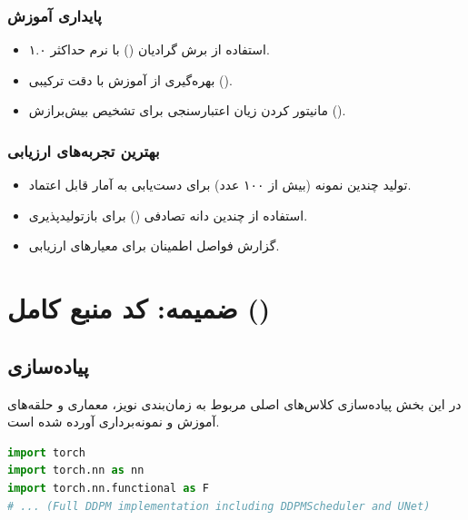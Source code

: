 \begin{latin}
\subsubsection{پایداری آموزش}
\begin{itemize}
    \item استفاده از برش گرادیان () با نرم حداکثر ۱.۰.
    \item بهره‌گیری از آموزش با دقت ترکیبی ().
    \item مانیتور کردن زیان اعتبارسنجی برای تشخیص بیش‌برازش ().
\end{itemize}



\subsubsection{بهترین تجربه‌های ارزیابی}
\begin{itemize}
    \item تولید چندین نمونه (بیش از ۱۰۰ عدد) برای دست‌یابی به آمار قابل اعتماد.
    \item استفاده از چندین دانه تصادفی () برای بازتولیدپذیری.
    \item گزارش فواصل اطمینان برای معیارهای ارزیابی.
\end{itemize}

\clearpage

\section{ضمیمه: کد منبع کامل ()}

\subsection{پیاده‌سازی }
در این بخش پیاده‌سازی کلاس‌های اصلی مربوط به زمان‌بندی نویز، معماری  و حلقه‌های آموزش و نمونه‌برداری آورده شده است.

\begin{latin}
\begin{lstlisting}[language=Python]
import torch
import torch.nn as nn
import torch.nn.functional as F
# ... (Full DDPM implementation including DDPMScheduler and UNet)
\end{lstlisting}
\end{latin}


\end{latin}
